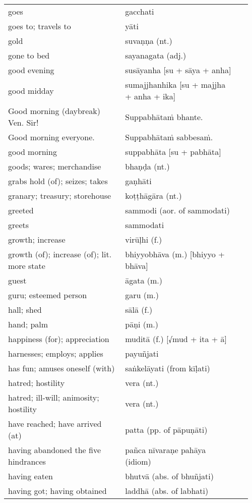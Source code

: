 \documentclass[a5paper]{memoir}
\begin{document}
\begin{longtable}{L{0.48\linewidth} L{0.48\linewidth} H}
goes & gacchati & \\[0pt]
goes to; travels to & yāti & \\[0pt]
gold & suvaṇṇa (nt.) & \\[0pt]
gone to bed & sayanagata (adj.) & \\[0pt]
good evening & susāyanha [su + sāya + anha] & \\[0pt]
good midday & sumajjhanhika [su + majjha + anha + ika] & \\[0pt]
Good morning (daybreak) Ven. Sir! & Suppabhātaṁ bhante. & \\[0pt]
Good morning everyone. & Suppabhātaṁ sabbesaṁ. & \\[0pt]
good morning & suppabhāta [su + pabhāta] & \\[0pt]
goods; wares; merchandise & bhaṇḍa (nt.) & \\[0pt]
grabs hold (of); seizes; takes & gaṇhāti & \\[0pt]
granary; treasury; storehouse & koṭṭhāgāra (nt.) & \\[0pt]
greeted & sammodi (aor. of sammodati) & \\[0pt]
greets & sammodati & \\[0pt]
growth; increase & virūḷhi (f.) & \\[0pt]
growth (of); increase (of); lit. more state & bhiyyobhāva (m.) [bhiyyo + bhāva] & \\[0pt]
guest & āgata (m.) & \\[0pt]
guru; esteemed person & garu (m.) & \\[0pt]
hall; shed & sālā (f.) & \\[0pt]
hand; palm & pāṇi (m.) & \\[0pt]
happiness (for); appreciation & muditā (f.) [√mud + ita + ā] & \\[0pt]
harnesses; employs; applies & payuñjati & \\[0pt]
has fun; amuses oneself (with) & saṅkelāyati (from kīḷati) & \\[0pt]
hatred; hostility & vera (nt.) & \\[0pt]
hatred; ill-will; animosity; hostility & vera (nt.) & \\[0pt]
have reached; have arrived (at) & patta (pp. of pāpuṇāti) & \\[0pt]
having abandoned the five hindrances & pañca nīvaraṇe pahāya (idiom) & \\[0pt]
having eaten & bhutvā (abs. of bhuñjati) & \\[0pt]
having got; having obtained & laddhā (abs. of labhati) & \\[0pt]

\end{longtable}
\end{document}
